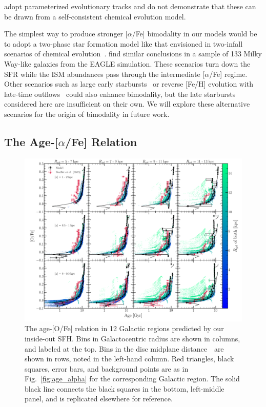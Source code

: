 \documentclass[draft2.tex]{subfiles}
\begin{document}
adopt parameterized evolutionary tracks and do not demonstrate that these can 
be drawn from a self-consistent chemical evolution model. 
\par 
The simplest way to produce stronger [$\alpha$/Fe] bimodality in our models 
would be to adopt a two-phase star formation model like that envisioned in 
two-infall scenarios of chemical evolution~\citep[e.g.][]{Chiappini1997, 
Chiappini2001, Romano2010, Grisoni2017, Noguchi2018, Palla2020, Spitoni2016, 
Spitoni2018, Spitoni2019a, Spitoni2020, Spitoni2021}. 
{\color{red} 
\citet{Mackereth2018} find similar conclusions in a sample of 133 Milky 
Way-like galaxies from the EAGLE simulation.
} 
These scenarios turn down the SFR while the ISM abundances pass through the 
intermediate [$\alpha$/Fe] regime. 
Other scenarios such as large early starbursts~\citep{Clarke2019} or reverse 
[Fe/H] evolution with late-time outflows~\citep{Weinberg2017} could also 
enhance bimodality, but the late starbursts considered here are insufficient 
on their own. 
We will explore these alternative scenarios for the origin of bimodality in 
future work. 

\subsection{The Age-[$\alpha$/Fe] Relation} 
\label{sec:obs_comp:age_alpha} 

\begin{figure} 
\centering 
\includegraphics[scale = 0.32]{age_alpha_regions.pdf} 
\caption{The age-[O/Fe] relation in 12 Galactic regions predicted by our 
inside-out SFH. Bins in Galactocentric radius are shown in columns, and labeled 
at the top. 
Bins in the disc midplane distance~\absz~are shown in rows, noted in the 
left-hand column. Red triangles, black squares, 
error bars, and background points are as in Fig.~\ref{fig:age_alpha} for the 
corresponding Galactic region. The solid black line connects the black squares 
in the bottom, left-middle panel, and is replicated elsewhere for reference. } 
\label{fig:age_alpha_regions} 
\end{figure} 
\end{document}
